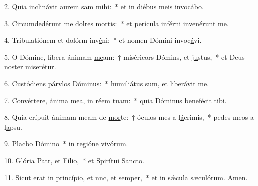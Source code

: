 2. Quia inclinávit aurem sam m\uline{i}hi:~* et in diébus meis invoc\uline{á}bo.\par 
3. Circumdedérunt me dolres m\uline{o}rtis:~* et perícula inférni inven\uline{é}runt me.\par 
4. Tribulatiónem et dolórm inv\uline{é}ni:~* et nomen Dómini invoc\uline{á}vi.\par 
5. O Dómine, líbera ánimam \uline{me}am:~† miséricors Dómins, et j\uline{u}stus,~* et Deus noster miser\uline{é}tur.\par 
6. Custódiens párvlos D\uline{ó}minus:~* humiliátus sum, et liber\uline{á}vit me.\par 
7. Convértere, ánima mea, in réem t\uline{u}am:~* quia Dóminus benefécit t\uline{i}bi.\par 
8. Quia erípuit ánimam meam de \uline{mor}te:~† óculos mes a l\uline{á}crimis,~* pedes meos a l\uline{a}psu.\par 
9. Placbo D\uline{ó}mino~* in regióne viv\uline{ó}rum.\par 
10. Glória Patr, et F\uline{í}lio,~* et Spirítui S\uline{a}ncto.\par 
11. Sicut erat in princípio, et nnc, et s\uline{e}mper,~* et in sǽcula sæculórum. \uline{A}men.\par 
